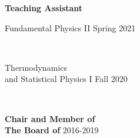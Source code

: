 \documentclass[9pt, purple]{./template/cv} %
\begin{document}
\hfill
\begin{minipage}[t]{0.32\textwidth}
	\vspace{-\baselineskip} %
	
	
	\vspace{1.2mm}

        \begin{minipage}[t]{\linewidth}
		\vspace{-\baselineskip}
		\vspace{0mm}
		\small \textbf{Teaching Assistant} \hfill {}\\ 

            \vspace{-1mm}
            \hspace{1mm}\itemmarker 
            \begin{minipage}[t]{0.95\linewidth}
                Fundamental Physics II \hfill \footnotesize\textcolor{accentbackground}{Spring 2021}
            \end{minipage}\\

            \vspace{-2mm}
            \hspace{1mm}\itemmarker 
            \begin{minipage}[t]{0.95\linewidth}
                Thermodynamics \\and Statistical Physics I \hfill \footnotesize \textcolor{accentbackground}{Fall 2020}
            \end{minipage}
	\end{minipage}\hfill\\

        \vspace{1mm}
	\begin{minipage}[t]{\linewidth}
		\vspace{-\baselineskip}
		\vspace{0mm}
            \small \textbf{Chair and Member of \hfill {}\\
            The Board of } \hfill \footnotesize \textcolor{accentbackground}{2016-2019}\\
	\end{minipage}\hfill\\
\end{minipage}
\end{document}
